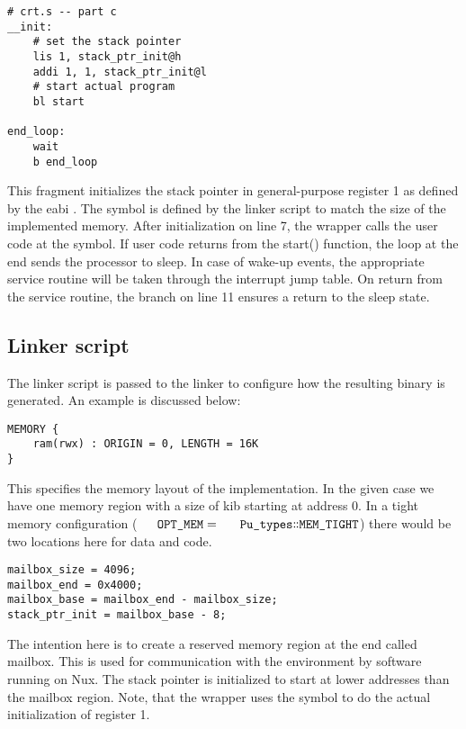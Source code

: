 \begin{lstlisting}[language=powerasm]
# crt.s -- part c
__init:
	# set the stack pointer
	lis 1, stack_ptr_init@h
	addi 1, 1, stack_ptr_init@l
	# start actual program
	bl start

end_loop:
	wait
	b end_loop
\end{lstlisting}
This fragment initializes the stack pointer in general-purpose register 1 as defined by the \gls{eabi} \citep{IBM1998}.
The symbol  is defined by the linker script to match the size of the implemented memory.
After initialization on line 7, the wrapper calls the user code at the  symbol.
If user code returns from the start() function, the loop at the end sends the processor to sleep.
In case of wake-up events, the appropriate service routine will be taken through the interrupt jump table.
On return from the service routine, the branch on line 11 ensures a return to the sleep state.


\subsection{Linker script}
The linker script  is passed to the linker to configure how the resulting binary is generated.
An example is discussed below:

\begin{lstlisting}
MEMORY {
	ram(rwx) : ORIGIN = 0, LENGTH = 16K
}
\end{lstlisting}
This specifies the memory layout of the implementation.
In the given case we have one memory region with a size of \unit[16]{kib} starting at address 0.
In a tight memory configuration ($ \code{OPT_MEM} = \code{Pu_types::MEM_TIGHT}$) there would be two locations here for data and code.


\begin{lstlisting}
mailbox_size = 4096;
mailbox_end = 0x4000;
mailbox_base = mailbox_end - mailbox_size;
stack_ptr_init = mailbox_base - 8;
\end{lstlisting}
The intention here is to create a reserved memory region at the end called mailbox.
This is used for communication with the environment by software running on Nux.
The stack pointer is initialized to start at lower addresses than the mailbox region.
Note, that the  wrapper uses the  symbol to do the actual initialization of register 1.


